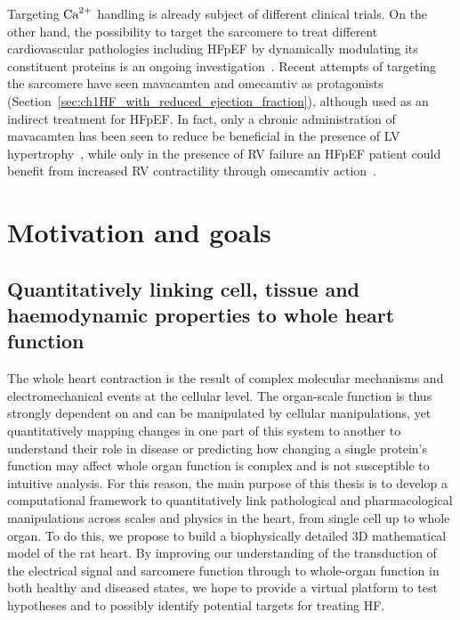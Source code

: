\vspace{0.2cm}
Targeting $\textrm{Ca}^{2+}$ handling is already subject of different clinical trials. On the other hand, the possibility to target the sarcomere to treat different cardiovascular pathologies including HFpEF by dynamically modulating its constituent proteins is an ongoing investigation~\cite{Patel:2019}. Recent attempts of targeting the sarcomere have seen mavacamten and omecamtiv as protagonists (Section~\ref{sec:ch1HF_with_reduced_ejection_fraction}), although used as an indirect treatment for HFpEF. In fact, only a chronic administration of mavacamten has been seen to reduce be beneficial in the presence of LV hypertrophy~\cite{Green:2016}, while only in the presence of RV failure an HFpEF patient could benefit from increased RV contractility through omecamtiv action~\cite{Planelles-Herrero:2017}.


%
%
%
\section{Motivation and goals}\label{sec:ch1motivation_and_goals}

%
%
%
\subsection{Quantitatively linking cell, tissue and haemodynamic properties to whole heart function}
The whole heart contraction is the result of complex molecular mechanisms and electromechanical events at the cellular level. The organ-scale function is thus strongly dependent on and can be manipulated by cellular manipulations, yet quantitatively mapping changes in one part of this system to another to understand their role in disease or predicting how changing a single protein's function may affect whole organ function is complex and is not susceptible to intuitive analysis. For this reason, the main purpose of this thesis is to develop a computational framework to quantitatively link pathological and pharmacological manipulations across scales and physics in the heart, from single cell up to whole organ. To do this, we propose to build a biophysically detailed $3$D mathematical model of the rat heart. By improving our understanding of the transduction of the electrical signal and sarcomere function through to whole-organ function in both healthy and diseased states, we hope to provide a virtual platform to test hypotheses and to possibly identify potential targets for treating HF.


%
%
%
